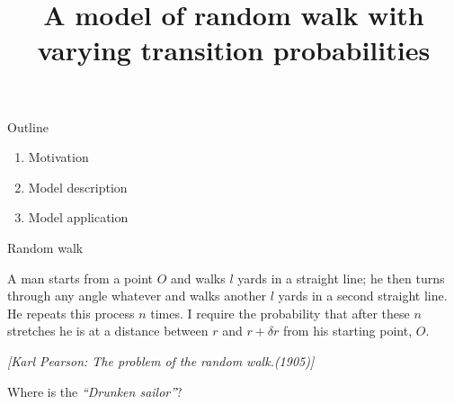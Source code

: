 \documentclass[american]{beamer}
\begin{document}
    \title{A model of random walk with varying transition probabilities}
    \maketitle

    \begin{frame}{Outline}
        \begin{enumerate}
            \item<1-> {\Large{}Motivation}\bigskip{}
            \item<2-> {\Large{}Model description}\bigskip{}
            \item<3-> {\Large{}Model application}
        \end{enumerate}
    \end{frame}

    \begin{frame}{Random walk}
        \begin{definition}
            A man starts from a point $O$ and walks $l$ yards in a straight
            line;
            he then turns through any angle whatever and walks another $l$
            yards in a second straight line.
            He repeats this process $n$ times.
            I require the probability that after these $n$ stretches he is at
            a distance between $r$ and $r+\delta r$ from his starting point,
            $O$.

            {\footnotesize{}\medskip{}\emph{[Karl Pearson: The problem of the random walk.(1905)]}}

            \begin{description}
                \item<2-> Where is the \emph{``Drunken sailor''}?
            \end{description}
        \end{definition}
    \end{frame}
\end{document}
